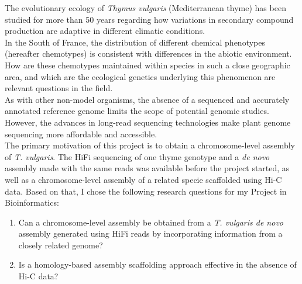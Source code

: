 The evolutionary ecology of \textit{Thymus vulgaris} (Mediterranean thyme) has been studied for more than 50 years regarding how variations in secondary compound production are adaptive in different climatic conditions.~\cite{thompsonPlantTraitsEcological2020}\\

In the South of France, the distribution of different chemical phenotypes (hereafter chemotypes) is consistent with differences in the abiotic environment. How are these chemotypes maintained within species in such a close geographic area, and which are the ecological genetics underlying this phenomenon are relevant questions in the field.~\cite{bataillonGenotypePhenotypeGenetic2022}\\

As with other non-model organisms, the absence of a sequenced and accurately annotated reference genome limits the scope of potential genomic studies. However, the advances in long-read sequencing technologies make plant genome sequencing more affordable and accessible.~\cite{puckerPlantGenomeSequence2022} \\

The primary motivation of this project is to obtain a chromosome-level assembly of \textit{T. vulgaris}. The \ac{HiFi} sequencing of one thyme genotype and a \textit{de novo} assembly made with the same reads was available before the project started, as well as a chromosome-level assembly of a related specie scaffolded using \ac{Hi-C} data. Based on that, I chose the following research questions for my Project in Bioinformatics:

\begin{enumerate}
    \item Can a chromosome-level assembly be obtained from a \textit{T. vulgaris de novo} assembly generated using \ac{HiFi} reads by incorporating information from a closely related genome?
    \item Is a homology-based assembly scaffolding approach effective in the absence of \ac{Hi-C} data?
\end{enumerate}